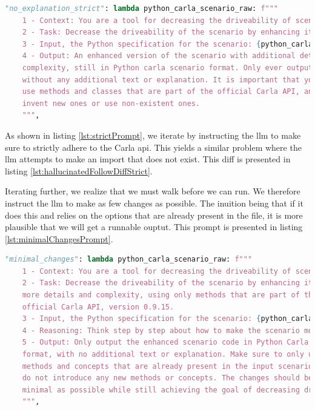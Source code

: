 \begin{lstlisting}[language=python, label={lst:strictPrompt}, caption={A slightly more advanced prompt instructing the \acrshort{llm} to strictly adhere to the Carla \acrshort{api}.}]
        "no_explanation_strict": lambda python_carla_scenario_raw: f"""
    1 - Context: You are a tool for decreasing the driveability of scenarios in the driving simulator Carla.
    2 - Task: Decrease the driveability of the scenario by enhancing it with more details and complexity.
    3 - Input, the Python specification for the scenario: {python_carla_scenario_raw}
    4 - Output: An enhanced version of the scenario with additional details and
    complexity, still in Python carla scenario format. Only ever output the code,
    without any additional text or explanation. It is important that you only
    use methods and classes that are part of the official Carla API, and do not
    invent new ones or use non-existent ones.
    """,
\end{lstlisting}

As shown in listing \ref{lst:strictPrompt}, we iterate by instructing the \acrshort{llm} to make
sure to strictly adhere to the Carla \acrshort{api}. This yields a similar problem where the
\acrshort{llm} attempts to make an import that does not exist. This diff is presented in listing
\ref{lst:hallucinatedFollowDiffStrict}.

Iterating further, we realize that we must walk before we can run. We therefore instruct the
\acrshort{llm} to make as few changes as possible. The inuition being that if it does this and
relies on the options that are already present in the file, it is more plausible that we will get a
runnable ouptut. This prompt is presented in listing \ref{lst:minimalChangesPrompt}.

\begin{lstlisting}[language=python, label={lst:minimalChangesPrompt}, caption={A prompt instructing the \acrshort{llm} to make as few changes as possible to increase the likelyhood of it working without issues.}]
        "minimal_changes": lambda python_carla_scenario_raw: f"""
    1 - Context: You are a tool for decreasing the driveability of scenarios in the driving simulator Carla.
    2 - Task: Decrease the driveability of the scenario by enhancing it with
    more details and complexity, using only methods that are part of the
    official Carla API, version 0.9.15.
    3 - Input, the Python specification for the scenario: {python_carla_scenario_raw}
    4 - Reasoning: Think step by step about how to make the scenario more complex and less driveable, considering possible obstacles, traffic, weather, and other factors using only the official Carla API.
    5 - Output: Only output the enhanced scenario code in Python Carla scenario
    format, with no additional text or explanation. Make sure to only use
    methods and concepts that are already present in the input scenario, and
    do not introduce any new methods or concepts. The changes should be as
    minimal as possible while still achieving the goal of decreasing driveability.
    """,
\end{lstlisting}

